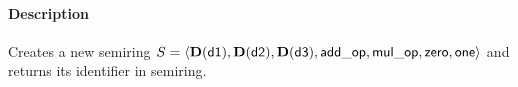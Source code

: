 \paragraph{Description}

Creates a new semiring $S = \langle \bold{D}({\sf d1}), \bold{D}({\sf d2}), 
\bold{D}({\sf d3}), {\sf add\_op}, {\sf mul\_op}, {\sf zero}, {\sf one} \rangle$ and 
returns its identifier in {\sf semiring}.


